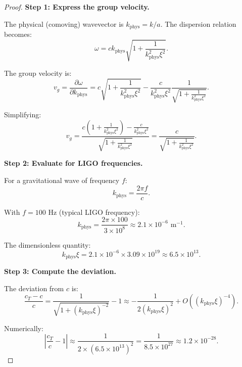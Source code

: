 \documentclass[11pt,a4paper]{article}
\newcommand{\cT}{\ensuremath{c_T}}
\theoremstyle{definition}
\theoremstyle{remark}
\begin{document}
\begin{proof}
\textbf{Step 1: Express the group velocity.}

The physical (comoving) wavevector is $k_{\mathrm{phys}} = k/a$. The dispersion relation becomes:
\begin{equation}
\omega = c k_{\mathrm{phys}}\sqrt{1 + \frac{1}{k_{\mathrm{phys}}^2\xi^2}}.
\end{equation}

The group velocity is:
\begin{equation}
v_g = \frac{\partial\omega}{\partial k_{\mathrm{phys}}} = c\sqrt{1 + \frac{1}{k_{\mathrm{phys}}^2\xi^2}} - \frac{c}{k_{\mathrm{phys}}^2\xi^2}\frac{1}{\sqrt{1 + \frac{1}{k_{\mathrm{phys}}^2\xi^2}}}.
\end{equation}

Simplifying:
\begin{equation}
v_g = \frac{c(1 + \frac{1}{k_{\mathrm{phys}}^2\xi^2}) - \frac{c}{k_{\mathrm{phys}}^2\xi^2}}{\sqrt{1 + \frac{1}{k_{\mathrm{phys}}^2\xi^2}}} = \frac{c}{\sqrt{1 + \frac{1}{k_{\mathrm{phys}}^2\xi^2}}}.
\end{equation}

\textbf{Step 2: Evaluate for LIGO frequencies.}

For a gravitational wave of frequency $f$:
\begin{equation}
k_{\mathrm{phys}} = \frac{2\pi f}{c}.
\end{equation}

With $f = 100$ Hz (typical LIGO frequency):
\begin{equation}
k_{\mathrm{phys}} = \frac{2\pi \times 100}{3 \times 10^8} \approx 2.1 \times 10^{-6} \text{ m}^{-1}.
\end{equation}

The dimensionless quantity:
\begin{equation}
k_{\mathrm{phys}}\xi = 2.1 \times 10^{-6} \times 3.09 \times 10^{19} \approx 6.5 \times 10^{13}.
\end{equation}

\textbf{Step 3: Compute the deviation.}

The deviation from $c$ is:
\begin{equation}
\frac{\cT - c}{c} = \frac{1}{\sqrt{1 + (k_{\mathrm{phys}}\xi)^{-2}}} - 1 \approx -\frac{1}{2(k_{\mathrm{phys}}\xi)^2} + O((k_{\mathrm{phys}}\xi)^{-4}).
\end{equation}

Numerically:
\begin{equation}
\left|\frac{\cT}{c} - 1\right| \approx \frac{1}{2 \times (6.5 \times 10^{13})^2} = \frac{1}{8.5 \times 10^{27}} \approx 1.2 \times 10^{-28}.
\end{equation}


\end{proof}
\end{document}
